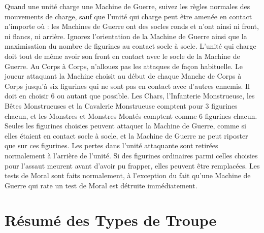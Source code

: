 Quand une unité charge une Machine de Guerre, suivez les règles normales des mouvements de charge, sauf que l'unité qui charge peut être amenée en contact n'importe où : les Machines de Guerre ont des socles ronds et n'ont ainsi ni front, ni flancs, ni arrière. Ignorez l'orientation de la Machine de Guerre ainsi que la maximisation du nombre de figurines au contact socle à socle. L'unité qui charge doit tout de même avoir son front en contact avec le socle de la Machine de Guerre.  Au Corps à Corps, n'allouez pas les attaques de façon habituelle. Le joueur attaquant la Machine choisit au début de chaque Manche de Corps à Corps jusqu'à six figurines qui ne sont pas en contact avec d'autres ennemis. Il doit en choisir 6 ou autant que possible. Les Chars, l'Infanterie Monstrueuse, les Bêtes Monstrueuses et la Cavalerie Monstrueuse comptent pour 3 figurines chacun, et les Monstres et Monstres Montés comptent comme 6 figurines chacun. Seules les figurines choisies peuvent attaquer la Machine de Guerre, comme si elles étaient en contact socle à socle, et la Machine de Guerre ne peut riposter que sur ces figurines. Les pertes dans l'unité attaquante sont retirées normalement à l'arrière de l'unité. Si des figurines ordinaires parmi celles choisies pour l'assaut meurent avant d'avoir pu frapper, elles peuvent être remplacées. Les tests de Moral sont faits normalement, à l'exception du fait qu'une Machine de Guerre qui rate un test de Moral est détruite immédiatement.

\newpage
\section*{Résumé des Types de Troupe}

